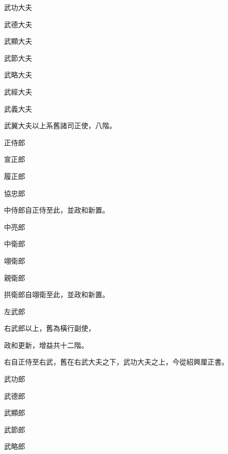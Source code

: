 \begin{pinyinscope}
 武功大夫



 武德大夫



 武顯大夫



 武節大夫



 武略大夫



 武經大夫



 武義大夫



 武翼大夫以上系舊諸司正使，八階。



 正侍郎



 宣正郎



 履正郎



 協忠郎



 中侍郎自正侍至此，並政和新置。



 中亮郎



 中衛郎



 翊衛郎



 親衛郎



 拱衛郎自翊衛至此，並政和新置。



 左武郎



 右武郎以上，舊為橫行副使，



 政和更新，增益共十二階。



 右自正侍至右武，舊在右武大夫之下，武功大夫之上，今從紹興厘正書。



 武功郎



 武德郎



 武顯郎



 武節郎



 武略郎




\end{pinyinscope}

